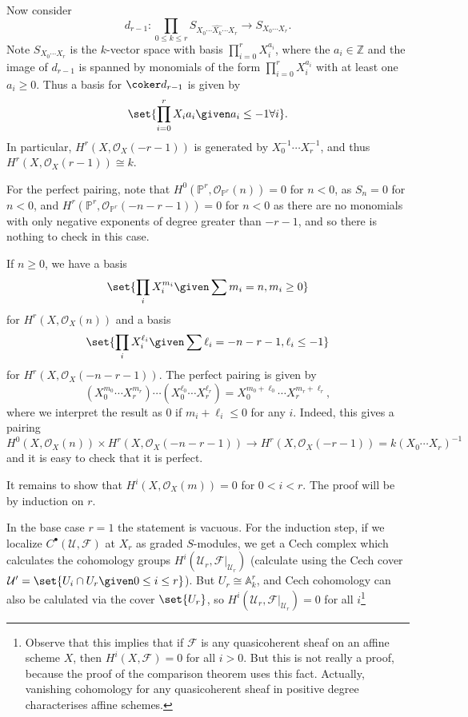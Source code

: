 Now consider
\[ d_{r-1}\colon \prod_{0\leq k\leq r} S_{X_0\cdots \widehat{X_k}\cdots X_r} \to S_{X_0\cdots X_r}. \]
Note $S_{X_0\cdots X_r}$ is the $k$-vector space with basis
$\prod_{i = 0}^r X_i^{a_i}$, where the $a_i \in \mathbb{Z}$ and the image of
$d_{r-1}$ is spanned by monomials of the form
$\prod_{i = 0}^r X_i^{a_i}$ with at least one $a_i\geq 0$. Thus a basis
for $\coker d_{r-1}$ is given by
\[ \set{\prod_{i =0}^r X_ia_i\given a_i\leq -1 \forall i}. \]
In particular, $H^r(X, \mathcal{O}_X(-r-1))$ is generated by
$X_0^{-1}\cdots X_r^{-1}$, and thus $H^r(X, \mathcal{O}_X(r-1))\cong k$.

For the perfect pairing, note that $H^0(\mathbb{P}^r, \mathcal{O}_{\mathbb{P}^r}(n)) = 0$
for $n < 0$, as $S_n = 0$ for $n < 0$, and $H^r(\mathbb{P}^r, \mathcal{O}_{\mathbb{P}^r}(-n-r-1)) = 0$
for $n < 0$ as there are no monomials with only negative exponents of degree
greater than $-r-1$, and so there is nothing to check in this case.

If $n\geq 0$, we have a basis
\[ \set{\prod_i X_i^{m_i}\given\sum m_i = n, m_i\geq 0} \]
for $H^r(X, \mathcal{O}_X(n))$ and a basis
\[ \set{\prod_i X_i^{\ell_i}\given \sum \ell_i = -n-r-1, \ell_i\leq -1} \]
for $H^r(X, \mathcal{O}_X(-n-r-1))$. The perfect pairing is given by
\[ (X_0^{m_0}\cdots X_r^{m_r})\cdots(X_0^{\ell_0}\cdots X_r^{\ell_r}) = X_0^{m_0+\ell_0}\cdots X_r^{m_r+\ell_r}, \]
where we interpret the result as $0$ if $m_i+\ell_i \leq 0$ for any $i$. Indeed,
this gives a pairing
\[ H^0(X, \mathcal{O}_X(n))\times H^r(X, \mathcal{O}_X(-n-r-1))\to H^r(X, \mathcal{O}_X(-r-1)) = k(X_0\cdots X_r)^{-1} \]
and it is easy to check that it is perfect.

It remains to show that $H^i(X, \mathcal{O}_X(m)) = 0$ for $0 < i < r$. The proof
will be by induction on $r$.

In the base case $r=1$ the statement is vacuous. For the induction step, if
we localize $C^\bullet(\mathcal{U}, \mathcal{F})$ at $X_r$ as graded $S$-modules,
we get a Cech complex which calculates the cohomology groups $H^i(\mathcal{U}_r, \mathcal{F}|_{\mathcal{U}_r})$
(calculate using the Cech cover $\mathcal{U}' = \set{U_i\cap U_r\given 0\leq i\leq r}$).
But $U_r\cong \mathbb{A}^r_k$, and Cech cohomology can also be calulated via
the cover $\set{U_r}$, so $H^i(\mathcal{U}_r, \mathcal{F}|_{\mathcal{U}_r}) = 0$ for
all $i$\footnote{Observe that this implies that if $\mathcal{F}$ is any quasicoherent
sheaf on an affine scheme $X$, then $H^i(X, \mathcal{F}) = 0$ for all $i > 0$. But this
is not really a proof, because the proof of the comparison theorem uses this fact. Actually,
vanishing cohomology for any quasicoherent sheaf in positive degree characterises affine
schemes.}

